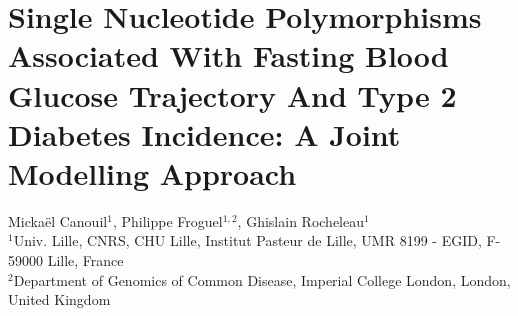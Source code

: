 \documentclass[11pt, a4paper]{article}
\begin{document}
\section*{Single Nucleotide Polymorphisms Associated With Fasting Blood Glucose Trajectory And Type 2 Diabetes Incidence: \linebreak A Joint \mbox{Modelling} Approach}

\par{\small{{
    Mickaël Canouil$^{1}$, Philippe Froguel$^{1,2}$, Ghislain Rocheleau$^{1}$\\
    $^{1}$Univ. Lille, CNRS, CHU Lille, Institut Pasteur de Lille, UMR 8199 - EGID, F-59000 Lille, France\\
    $^{2}$Department of Genomics of Common Disease, Imperial College London, London, United Kingdom
}}}

\par{

}
\end{document}
